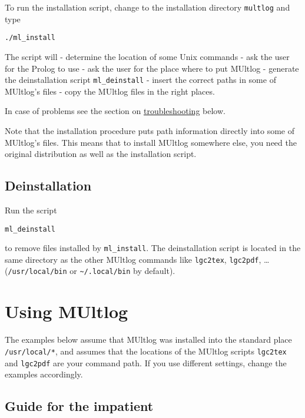 \documentclass[]{article}
\begin{document}
To run the installation script, change to the installation directory
\texttt{multlog} and type

\begin{verbatim}
./ml_install
\end{verbatim}

The script will - determine the location of some Unix commands - ask the
user for the Prolog to use - ask the user for the place where to put
MUltlog - generate the deinstallation script \texttt{ml\_deinstall} -
insert the correct paths in some of MUltlog's files - copy the MUltlog
files in the right places.

In case of problems see the section on
\protect\hyperlink{troubleshooting}{troubleshooting} below.

Note that the installation procedure puts path information directly into
some of MUltlog's files. This means that to install MUltlog somewhere
else, you need the original distribution as well as the installation
script.

\hypertarget{deinstallation}{%
\subsection{Deinstallation}\label{deinstallation}}

Run the script

\begin{verbatim}
ml_deinstall
\end{verbatim}

to remove files installed by \texttt{ml\_install}. The deinstallation
script is located in the same directory as the other MUltlog commands
like \texttt{lgc2tex}, \texttt{lgc2pdf}, \ldots{}
(\texttt{/usr/local/bin} or \texttt{\textasciitilde{}/.local/bin} by
default).

\hypertarget{using-multlog}{%
\section{Using MUltlog}\label{using-multlog}}

The examples below assume that MUltlog was installed into the standard
place \texttt{/usr/local/*}, and assumes that the locations of the
MUltlog scripts \texttt{lgc2tex} and \texttt{lgc2pdf} are your command
path. If you use different settings, change the examples accordingly.

\hypertarget{guide-for-the-impatient}{%
\subsection{Guide for the impatient}\label{guide-for-the-impatient}}
\end{document}
